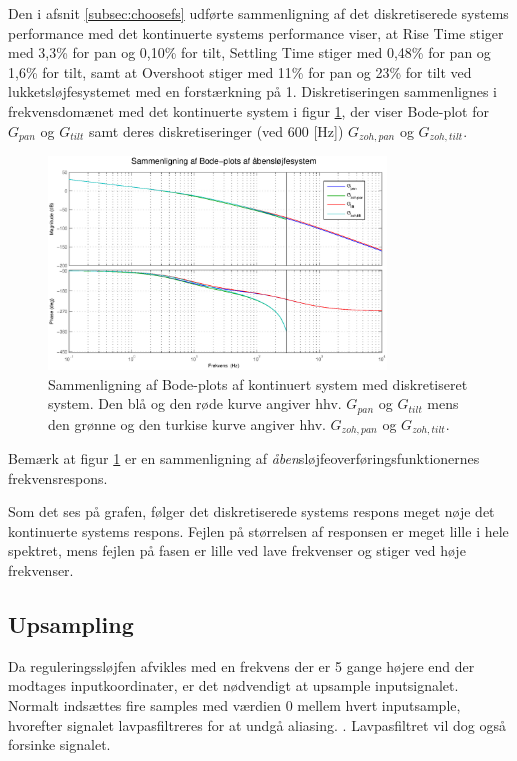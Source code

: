 Den i afsnit \ref{subsec:choosefs} udførte sammenligning af det diskretiserede systems performance
med det kontinuerte systems performance viser,
at Rise Time stiger med 3,3\% for pan og 0,10\% for tilt,
Settling Time stiger med 0,48\% for pan og 1,6\% for tilt,
samt at Overshoot stiger med 11\% for pan og 23\% for tilt
ved lukketsløjfesystemet med en forstærkning på 1.
Diskretiseringen sammenlignes i frekvensdomænet med det kontinuerte system
i figur \ref{fig:diskretBode}, der viser Bode-plot for \(G_{pan}\) og \(G_{tilt}\) samt
deres diskretiseringer (ved 600 [Hz]) \(G_{zoh,pan}\) og \(G_{zoh,tilt}\).
\begin{figure}[!th]
\centering
	\includegraphics[width=0.8\textwidth]{./graphics/diskretBode.eps}
	\captionsetup{width=0.7\textwidth}
\caption[Sammenligning af Bode-plots]
{Sammenligning af Bode-plots af kontinuert system med diskretiseret system.
Den blå og den røde kurve angiver hhv. \(G_{pan}\) og \(G_{tilt}\) mens
den grønne og den turkise kurve angiver hhv. \(G_{zoh,pan}\) og \(G_{zoh,tilt}\).
}
\label{fig:diskretBode}
\end{figure}
Bemærk at figur \ref{fig:diskretBode} er en sammenligning af \textit{åben}sløjfeoverføringsfunktionernes
frekvensrespons.

Som det ses på grafen, følger det diskretiserede systems respons meget nøje det kontinuerte systems respons.
Fejlen på størrelsen af responsen er meget lille i hele spektret,
mens fejlen på fasen er lille ved lave frekvenser og stiger ved høje frekvenser.

\subsection{Upsampling}
\label{subsec:upsampling}

Da reguleringssløjfen afvikles med en frekvens der er 5 gange højere end der modtages inputkoordinater, er det nødvendigt at upsample inputsignalet. 
Normalt indsættes fire samples med værdien 0 mellem hvert inputsample, hvorefter signalet lavpasfiltreres for at undgå aliasing. \citep[s. 562]{dsp}. 
Lavpasfiltret vil dog også forsinke signalet. 



